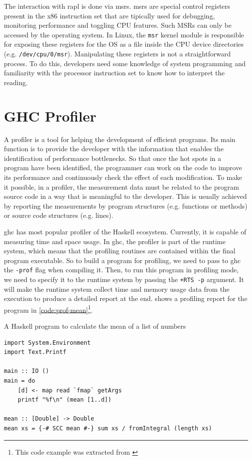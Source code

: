 The interaction with \acs{rapl} is done via \acp{msr}. \acp{msr} are special control registers present in the x86 instruction set that are tipically used for debugging, monitoring performance and toggling CPU features. Such MSRs can only be accessed by the operating system. In Linux, the \texttt{msr} kernel module is responsible for exposing these registers for the OS as a file inside the CPU device directories (e.g. \texttt{/dev/cpu/0/msr}). Manipulating these registers is not a straightforward process. To do this, developers need some knowledge of system programming and familiarity with the processor instruction set to know how to interpret the reading.


\section{GHC Profiler}\label{sec:profiler}
A profiler is a tool for helping the development of efficient programs. Its main function is to provide the developer with the information that enables the identification of performance bottlenecks. So that once the hot spots in a program have been identified, the programmer can work on the code to improve its performance and continuously check the effect of each modification. To make it possible, in a profiler, the measurement data must be related to the program source code in a way that is meaningful to the developer. This is usually achieved by reporting the measurements by program structures (e.g. functions or methods) or source code structures (e.g. lines).

\ac{ghc} has most popular profiler of the Haskell ecosystem. Currently, it is capable of measuring time and space usage. In \ac{ghc}, the profiler is part of the runtime system, which means that the profiling routines are contained within the final program executable. So to build a program for profiling, we need to pass to \ac{ghc} the \texttt{-prof} flag when compiling it. Then, to run this program in profiling mode, we need to specify it to the runtime system by passing the \texttt{+RTS -p} argument. It will make the runtime system collect time and memory usage data from the execution to produce a detailed report at the end.  shows a profiling report for the program in \autoref{code:prof-mean}\footnote{This code example was extracted from \cite{sullivan:2008}}.

\begin{listing}
  \caption{A Haskell program to calculate the mean of a list of numbers}
  \begin{verbatim}
import System.Environment
import Text.Printf

main :: IO ()
main = do
    [d] <- map read `fmap` getArgs
    printf "%f\n" (mean [1..d])

mean :: [Double] -> Double
mean xs = {-# SCC mean #-} sum xs / fromIntegral (length xs)
  \end{verbatim}
  \label{code:prof-mean}
\end{listing}

